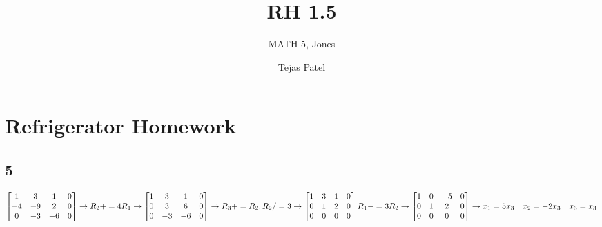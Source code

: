 \documentclass{article}
\title{RH 1.5}
\author{MATH 5, Jones}
\date{Tejas Patel}
\begin{document}
\maketitle
\section*{Refrigerator Homework}
\subsection*{5}
$
\begin{bmatrix}1&3&1&0\\-4&-9&2&0\\0&-3&-6&0\end{bmatrix} \rightarrow R_2+=4R_1 \rightarrow \begin{bmatrix}1&3&1&0\\0&3&6&0\\0&-3&-6&0\end{bmatrix}\rightarrow R_3+=R_2, R_2/=3\rightarrow \begin{bmatrix}1&3&1&0\\0&1&2&0\\0&0&0&0\end{bmatrix}
\\[0.1in] R_1-=3R_2 \rightarrow \begin{bmatrix}1&0&-5&0\\0&1&2&0\\0&0&0&0\end{bmatrix}
\rightarrow x_1=5x_3 \quad x_2=-2x_3 \quad x_3=x_3 
$  
\end{document}
